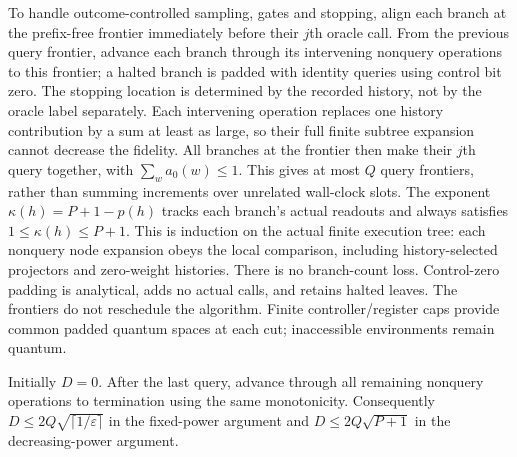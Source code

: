 \documentclass[11pt]{article}
\theoremstyle{remark}
\newcommand{\eps}{\varepsilon}
\begin{document}
To handle outcome-controlled sampling, gates and stopping, align each branch
at the prefix-free frontier
immediately before their $j$th oracle call. From the previous query frontier,
advance each branch through its intervening nonquery operations to this
frontier; a halted branch is padded with identity queries using control bit
zero. The stopping location is determined by the recorded history, not by
the oracle label separately. Each intervening operation replaces one history
contribution by a sum at least as large, so their full finite subtree
expansion cannot decrease the fidelity. All branches at the frontier then
make their $j$th query together, with $\sum_w a_0(w)\le1$. This gives at most
$Q$ query frontiers, rather than summing increments over unrelated wall-clock
slots. The exponent $\kappa(h)=P+1-p(h)$ tracks each branch's actual readouts
and always satisfies $1\le\kappa(h)\le P+1$.
This is induction on the actual finite execution tree: each nonquery node
expansion obeys the local comparison, including history-selected projectors
and zero-weight histories. There is no branch-count loss. Control-zero
padding is analytical, adds no actual calls, and retains halted leaves.
The frontiers do not reschedule the algorithm. Finite controller/register
caps provide common padded quantum spaces at each cut; inaccessible
environments remain quantum.

Initially $D=0$. After the last query, advance through all remaining nonquery
operations to termination using the same monotonicity. Consequently
$D\le2Q\sqrt{\lceil1/\eps\rceil}$ in the fixed-power argument and
$D\le2Q\sqrt{P+1}$ in the decreasing-power argument.
\end{document}
